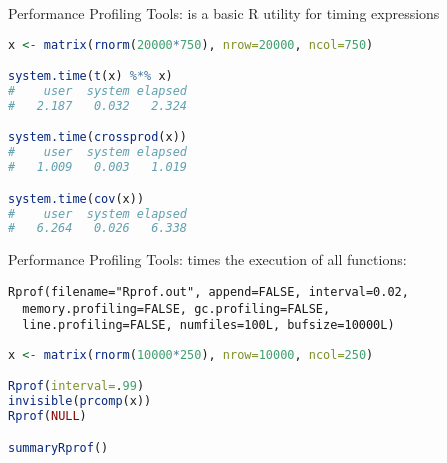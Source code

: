 \begin{frame}[fragile]
  \begin{block}{Performance Profiling Tools: }
   is a basic R utility for timing expressions
\begin{lstlisting}[language=R]
x <- matrix(rnorm(20000*750), nrow=20000, ncol=750)

system.time(t(x) %*% x)
#    user  system elapsed 
#   2.187   0.032   2.324

system.time(crossprod(x))
#    user  system elapsed 
#   1.009   0.003   1.019 

system.time(cov(x))
#    user  system elapsed 
#   6.264   0.026   6.338 
\end{lstlisting}
  \end{block}
\end{frame}



\begin{frame}[fragile]
\begin{block}{Performance Profiling Tools: }
 times the execution of all \R functions:
  \vspace{-.4cm}
\begin{lstlisting}[language=Rinteractive]
Rprof(filename="Rprof.out", append=FALSE, interval=0.02,
  memory.profiling=FALSE, gc.profiling=FALSE, 
  line.profiling=FALSE, numfiles=100L, bufsize=10000L)
\end{lstlisting}

\begin{lstlisting}[language=R]
x <- matrix(rnorm(10000*250), nrow=10000, ncol=250)

Rprof(interval=.99)
invisible(prcomp(x))
Rprof(NULL)

summaryRprof()
\end{lstlisting}
\end{block}
\end{frame}



